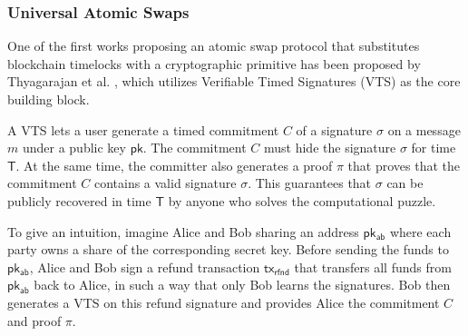 \documentclass{article}      	%
\begin{document}
%

\subsubsection{Universal Atomic Swaps}

One of the first works proposing an atomic swap protocol that substitutes blockchain timelocks with a cryptographic primitive has been proposed by Thyagarajan et al. \cite{uas}, which utilizes Verifiable Timed Signatures (VTS) \cite{vts} as the core building block.

A VTS lets a user generate a timed commitment $C$ of a signature $\sigma$ on a message $m$ under a public key $\mathsf{pk}$. The commitment $C $ must hide the signature $\sigma$ for time $\mathsf{T}$. At the same time, the committer also generates a proof $\pi$ that proves that the commitment $C$ contains a valid signature $\sigma$. This guarantees that $\sigma$ can be publicly recovered in time $\mathsf{T}$ by anyone who solves the computational puzzle.

To give an intuition, imagine Alice and Bob sharing an address $\mathsf{pk_{ab}}$ where each party owns a share of the corresponding secret key.  Before sending the funds to $\mathsf{pk_{ab}}$, Alice and Bob sign a refund transaction $\mathsf{tx_{rfnd}}$ that transfers all funds from $\mathsf{pk_{ab}}$ back to Alice, in such a way that only Bob learns the signatures. Bob then generates a VTS on this refund signature and provides Alice the commitment $C$ and proof $\pi$. \\
\end{document}
